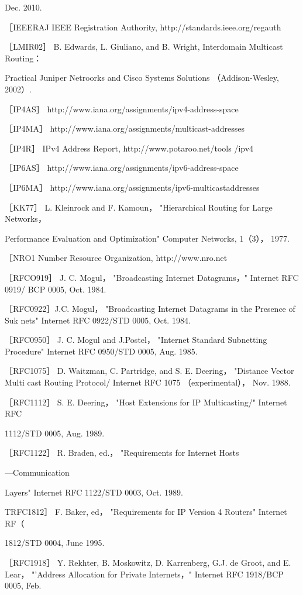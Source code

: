 Dec. 2010.

［IEEERAJ IEEE Registration Authority, http://standards.ieee.org/regauth

［LMIR02］ B. Edwards, L. Giuliano, and B. Wright, Interdomain Multicast Routing：

Practical Juniper Netroorks and Cisco Systems Solutions （Addison-Wesley, 2002）.

［IP4AS］ http://www.iana.org/assignments/ipv4-address-space

［IP4MA］ http://www.iana.org/assignments/multicast-addresses

［IP4R］ IPv4 Address Report, http://www.potaroo.net/tools /ipv4

［IP6AS］ http://www.iana.org/assignments/ipv6-address-space

［IP6MA］ http://www.iana.org/assignments/ipv6-multicastaddresses

［KK77］ L. Kleinrock and F. Kamoun， "Hierarchical Routing for Large Networks，

Performance Evaluation and Optimization" Computer Networks, 1（3）， 1977.

［NRO1 Number Resource Organization, http://www.nro.net

［RFCO919］ J. C. Mogul， "Broadcasting Internet Datagrams，" Internet RFC 0919/
BCP 0005, Oct. 1984.

［RFC0922］J.C. Mogul， "Broadcasting Internet Datagrams in the Presence of Suk
nets" Internet RFC 0922/STD 0005, Oct. 1984.

［RFC0950］ J. C. Mogul and J.Postel， "Internet Standard Subnetting Procedure"
Internet RFC 0950/STD 0005, Aug. 1985.

［RFC1075］ D. Waitzman, C. Partridge, and S. E. Deering， "Distance Vector Multi
cast Routing Protocol/ Internet RFC 1075 （experimental）， Nov. 1988.

［RFC1112］ S. E. Deering， "Host Extensions for IP Multicasting/" Internet RFC

1112/STD 0005, Aug. 1989.

［RFC1122］ R. Braden, ed.， "Requirements for Internet Hosts

—Communication

Layers" Internet RFC 1122/STD 0003, Oct. 1989.

TRFC1812］ F. Baker, ed， "Requirements for IP Version 4 Routers" Internet RF（

1812/STD 0004, June 1995.

［RFC1918］ Y. Rekhter, B. Moskowitz, D. Karrenberg, G.J. de Groot, and E. Lear，
"'Address Allocation for Private Internets，" Internet RFC 1918/BCP 0005, Feb.


